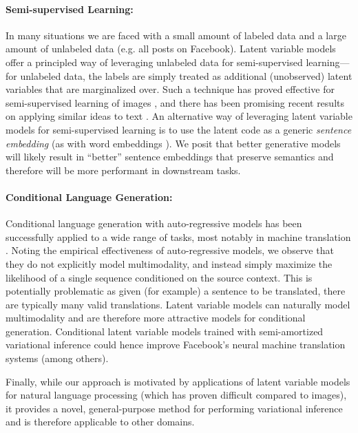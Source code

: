 \documentclass{article}
\begin{document}
\paragraph{Semi-supervised Learning:}
In many situations we are faced with a small amount of labeled data and
a large amount of unlabeled data (e.g. all posts on Facebook).
Latent variable models offer a principled way of leveraging unlabeled data
for semi-supervised learning---for unlabeled data, the labels are simply treated as additional (unobserved) latent variables that are marginalized over.
Such a technique has proved effective for semi-supervised learning of images \cite{Kingma2014b}, and there has been promising recent results on applying similar ideas to text \cite{Yang2017}. An alternative way of leveraging latent variable models for semi-supervised learning is to use the latent code as a generic \emph{sentence embedding} \cite{Hill2016} (as with word embeddings \cite{Mikolov2013a}). We posit that better generative models will likely result in
``better'' sentence embeddings that preserve semantics and therefore will be more performant in downstream tasks.
\vspace{-4mm}
\paragraph{Conditional Language Generation:}
Conditional language generation with auto-regressive models has been successfully applied to a wide range of tasks, most notably in  machine translation \cite{Sutskever2014,Cho2014}. Noting the empirical effectiveness of auto-regressive models, we observe that they do not explicitly model multimodality, and instead simply maximize the likelihood of a single sequence conditioned on the source context. This is potentially problematic as given (for example) a sentence to be translated, there are typically many valid translations. Latent variable models can naturally model multimodality and are therefore more attractive models for conditional generation. Conditional latent variable models trained with semi-amortized variational inference could hence improve Facebook's neural machine translation systems (among others).

Finally, while our approach is motivated by applications of latent variable models for natural language processing (which has proven difficult compared to images), it provides a novel, general-purpose method for performing variational inference and is therefore applicable to other domains.

\printbibliography
\end{document}
